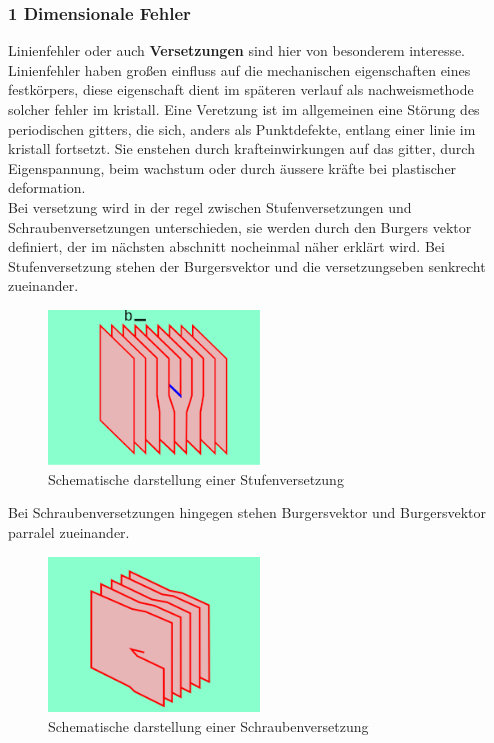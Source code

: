         \subsubsection*{1 Dimensionale Fehler}
            Linienfehler oder auch \textbf{Versetzungen} sind hier von besonderem interesse. Linienfehler haben 
            großen einfluss auf die mechanischen eigenschaften eines festkörpers, diese eigenschaft dient im späteren verlauf
            als nachweismethode solcher fehler im kristall. Eine Veretzung ist im allgemeinen eine Störung des periodischen gitters, 
            die sich, anders als Punktdefekte, entlang einer linie im kristall fortsetzt. Sie enstehen durch krafteinwirkungen auf das gitter,
            durch Eigenspannung, beim wachstum oder durch äussere kräfte bei plastischer deformation.\\
            Bei versetzung wird in der regel zwischen Stufenversetzungen und Schraubenversetzungen unterschieden,
            sie werden durch den Burgers vektor definiert, der im nächsten abschnitt nocheinmal näher erklärt wird.
            Bei Stufenversetzung stehen der Burgersvektor und die versetzungseben senkrecht zueinander.
            \begin{figure}[H]
                \centering
                \includegraphics[width=0.5\textwidth]{Images/Stufenversetzung}
                \caption{Schematische darstellung einer Stufenversetzung}
            \end{figure}
            Bei Schraubenversetzungen hingegen stehen Burgersvektor und Burgersvektor parralel zueinander.
            \begin{figure}[H]
                \centering
                \includegraphics[width=0.5\textwidth]{Images/Schraubenversetzung}
                \caption{Schematische darstellung einer Schraubenversetzung}
            \end{figure}
